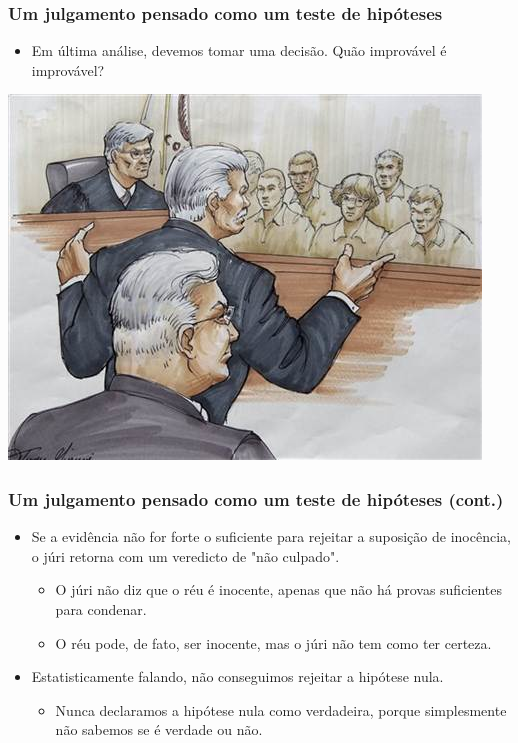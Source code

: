 \begin{frame}
\frametitle{Um julgamento pensado como um teste de hipóteses}
\begin{itemize}
\justifying
\item Em última análise, devemos tomar uma decisão. Quão improvável é improvável?

\end{itemize}
\justifying
\includegraphics[width=\textwidth]{1-8_gender_discrimination/trial.png}


\end{frame}


\begin{frame}
\frametitle{Um julgamento pensado como um teste de hipóteses (cont.)}

\begin{itemize}
\justifying
\item Se a evidência não for forte o suficiente para rejeitar a suposição de inocência, o júri retorna com um veredicto de "não culpado".
\begin{itemize}
\justifying
\item O júri não diz que o réu é inocente, apenas que não há provas suficientes para condenar.
\justifying
\item O réu pode, de fato, ser inocente, mas o júri não tem como ter certeza.

\end{itemize}
\justifying
\item Estatisticamente falando, não conseguimos rejeitar a hipótese nula.
\begin{itemize}
\justifying
\item Nunca declaramos a hipótese nula como verdadeira, porque simplesmente não sabemos se é verdade ou não.
\end{itemize}

\end{itemize}

\end{frame}

